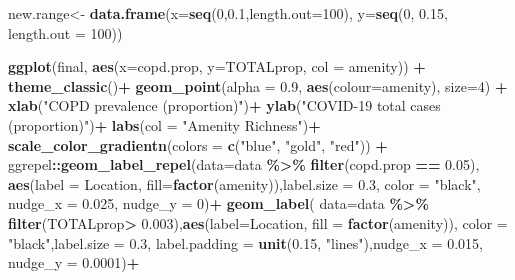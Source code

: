 \documentclass[]{article}
\newenvironment{Shaded}{\begin{snugshade}}{\end{snugshade}}
\newcommand{\DataTypeTok}[1]{\textcolor[rgb]{0.13,0.29,0.53}{#1}}
\newcommand{\DecValTok}[1]{\textcolor[rgb]{0.00,0.00,0.81}{#1}}
\newcommand{\FloatTok}[1]{\textcolor[rgb]{0.00,0.00,0.81}{#1}}
\newcommand{\KeywordTok}[1]{\textcolor[rgb]{0.13,0.29,0.53}{\textbf{#1}}}
\newcommand{\NormalTok}[1]{#1}
\newcommand{\OperatorTok}[1]{\textcolor[rgb]{0.81,0.36,0.00}{\textbf{#1}}}
\newcommand{\StringTok}[1]{\textcolor[rgb]{0.31,0.60,0.02}{#1}}
\begin{document}
\begin{Shaded}
\begin{Highlighting}[]
\NormalTok{new.range\textless{}{-}}\StringTok{ }\KeywordTok{data.frame}\NormalTok{(}\DataTypeTok{x=}\KeywordTok{seq}\NormalTok{(}\DecValTok{0}\NormalTok{,}\FloatTok{0.1}\NormalTok{,}\DataTypeTok{length.out=}\DecValTok{100}\NormalTok{), }\DataTypeTok{y=}\KeywordTok{seq}\NormalTok{(}\DecValTok{0}\NormalTok{, }\FloatTok{0.15}\NormalTok{, }\DataTypeTok{length.out =} \DecValTok{100}\NormalTok{))}


\KeywordTok{ggplot}\NormalTok{(final, }\KeywordTok{aes}\NormalTok{(}\DataTypeTok{x=}\NormalTok{copd.prop, }\DataTypeTok{y=}\NormalTok{TOTALprop, }\DataTypeTok{col =}\NormalTok{ amenity)) }\OperatorTok{+}
\StringTok{  }\KeywordTok{theme\_classic}\NormalTok{()}\OperatorTok{+}
\StringTok{  }\KeywordTok{geom\_point}\NormalTok{(}\DataTypeTok{alpha =} \FloatTok{0.9}\NormalTok{, }\KeywordTok{aes}\NormalTok{(}\DataTypeTok{colour=}\NormalTok{amenity), }\DataTypeTok{size=}\DecValTok{4}\NormalTok{) }\OperatorTok{+}\StringTok{ }
\StringTok{  }\KeywordTok{xlab}\NormalTok{(}\StringTok{"COPD prevalence (proportion)"}\NormalTok{)}\OperatorTok{+}
\StringTok{  }\KeywordTok{ylab}\NormalTok{(}\StringTok{"COVID{-}19 total cases (proportion)"}\NormalTok{)}\OperatorTok{+}
\StringTok{  }\KeywordTok{labs}\NormalTok{(}\DataTypeTok{col =} \StringTok{"Amenity Richness"}\NormalTok{)}\OperatorTok{+}
\StringTok{  }\KeywordTok{scale\_color\_gradientn}\NormalTok{(}\DataTypeTok{colors =} \KeywordTok{c}\NormalTok{(}\StringTok{"blue"}\NormalTok{, }\StringTok{"gold"}\NormalTok{, }\StringTok{"red"}\NormalTok{)) }\OperatorTok{+}
\StringTok{ }
\NormalTok{ggrepel}\OperatorTok{::}\KeywordTok{geom\_label\_repel}\NormalTok{(}\DataTypeTok{data=}\NormalTok{data }\OperatorTok{\%\textgreater{}\%}\StringTok{ }\KeywordTok{filter}\NormalTok{(copd.prop }\OperatorTok{==}\StringTok{ }\FloatTok{0.05}\NormalTok{), }\KeywordTok{aes}\NormalTok{(}\DataTypeTok{label =}\NormalTok{ Location, }\DataTypeTok{fill=}\KeywordTok{factor}\NormalTok{(amenity)),}\DataTypeTok{label.size =} \FloatTok{0.3}\NormalTok{, }\DataTypeTok{color =} \StringTok{"black"}\NormalTok{,  }\DataTypeTok{nudge\_x =} \FloatTok{0.025}\NormalTok{, }\DataTypeTok{nudge\_y =} \DecValTok{0}\NormalTok{)}\OperatorTok{+}
\StringTok{  }
\KeywordTok{geom\_label}\NormalTok{( }\DataTypeTok{data=}\NormalTok{data }\OperatorTok{\%\textgreater{}\%}\StringTok{ }\KeywordTok{filter}\NormalTok{(TOTALprop}\OperatorTok{\textgreater{}}\StringTok{ }\FloatTok{0.003}\NormalTok{),}\KeywordTok{aes}\NormalTok{(}\DataTypeTok{label=}\NormalTok{Location, }\DataTypeTok{fill =} \KeywordTok{factor}\NormalTok{(amenity)), }\DataTypeTok{color =} \StringTok{"black"}\NormalTok{,}\DataTypeTok{label.size =} \FloatTok{0.3}\NormalTok{, }\DataTypeTok{label.padding =} \KeywordTok{unit}\NormalTok{(}\FloatTok{0.15}\NormalTok{, }\StringTok{"lines"}\NormalTok{),}\DataTypeTok{nudge\_x =} \FloatTok{0.015}\NormalTok{, }\DataTypeTok{nudge\_y =} \FloatTok{0.0001}\NormalTok{)}\OperatorTok{+}\StringTok{ }

\end{Highlighting}
\end{Shaded}
\end{document}
